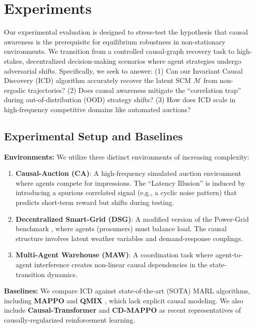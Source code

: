 \section{Experiments}
\label{sec:experiments}

Our experimental evaluation is designed to stress-test the hypothesis that causal awareness is the prerequisite for equilibrium robustness in non-stationary environments. We transition from a controlled causal-graph recovery task to high-stakes, decentralized decision-making scenarios where agent strategies undergo adversarial shifts. Specifically, we seek to answer: (1) Can our Invariant Causal Discovery (ICD) algorithm accurately recover the latent SCM $\mathcal{M}$ from non-ergodic trajectories? (2) Does causal awareness mitigate the ``correlation trap'' during out-of-distribution (OOD) strategy shifts? (3) How does ICD scale in high-frequency competitive domains like automated auctions?

\subsection{Experimental Setup and Baselines}
\textbf{Environments:} We utilize three distinct environments of increasing complexity:
\begin{enumerate}
    \item \textbf{Causal-Auction (CA)}: A high-frequency simulated auction environment \cite{ref_new_amazonawscom} where agents compete for impressions. The ``Latency Illusion'' is induced by introducing a spurious correlated signal (e.g., a cyclic noise pattern) that predicts short-term reward but shifts during testing.
    \item \textbf{Decentralized Smart-Grid (DSG)}: A modified version of the Power-Grid benchmark \cite{ref_new_arxivorg}, where agents (prosumers) must balance load. The causal structure involves latent weather variables and demand-response couplings.
    \item \textbf{Multi-Agent Warehouse (MAW)}: A coordination task \cite{papoudakis2021agent} where agent-to-agent interference creates non-linear causal dependencies in the state-transition dynamics.
\end{enumerate}

\textbf{Baselines:} We compare ICD against state-of-the-art (SOTA) MARL algorithms, including \textbf{MAPPO} \cite{yu2022surprising} and \textbf{QMIX} \cite{shoham2008multiagent}, which lack explicit causal modeling. We also include \textbf{Causal-Transformer} \cite{ref_new_arxivorg} and \textbf{CD-MAPPO} \cite{gao2024causal} as recent representatives of causally-regularized reinforcement learning.

